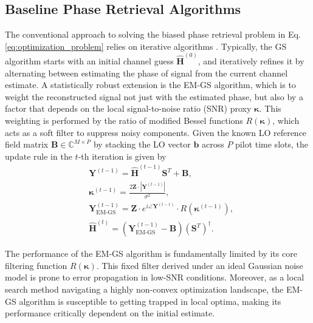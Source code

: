 \documentclass[journal]{IEEEtran}
\begin{document}
\subsection{Baseline Phase Retrieval Algorithms}
The conventional approach to solving the biased phase retrieval problem in Eq. \eqref{eq:optimization_problem} relies on iterative algorithms \cite{b2}. 
Typically, the GS algorithm starts with an initial channel guess $\hat{\mathbf{H}}^{(0)}$, and iteratively refines it by alternating between estimating the phase of signal from the current channel estimate. A statistically robust extension is the EM-GS algorithm, which is to weight the reconstructed signal not just with the estimated phase, but also by a factor that depends on the local signal-to-noise ratio (SNR) proxy $\boldsymbol{\kappa}$. This weighting is performed by the ratio of modified Bessel functions $R(\boldsymbol{\kappa})$, which acts as a soft filter to suppress noisy components. Given the known LO reference field matrix $\mathbf{B} \in \mathbb{C}^{M \times P}$ by stacking the LO vector $\mathbf{b}$ across $P$ pilot time slots, the update rule in the $t$-th iteration is given by \cite{b2}
\begin{align}
&\mathbf{Y}^{(t-1)} = \hat{\mathbf{H}}^{(t-1)} \mathbf{S}^T + {\mathbf{B}}, \label{eq:emgs_y_complex_revised} \\
&\mathbf{\boldsymbol{\kappa}}^{(t-1)} = \frac{2 \mathbf{Z} {\cdot} |\mathbf{Y}^{(t-1)}|}{\sigma^2}, \label{eq:emgs_kappa} \\
&\mathbf{Y}_{\text{EM-GS}}^{(t-1)} = \mathbf{Z} {\cdot} e^{i\angle\mathbf{Y}^{(t-1)}} {\cdot} R(\mathbf{\boldsymbol{\kappa}}^{(t-1)}) \label{eq:emgs_y_rec_revised}, \\
&\hat{\mathbf{H}}^{(t)} = (\mathbf{Y}_{\text{EM-GS}}^{(t-1)} - \mathbf{B}) (\mathbf{S}^T)^{\dagger} \label{eq:emgs_update_revised}.
\end{align}

The performance of the EM-GS algorithm is fundamentally limited by its core filtering function $R(\boldsymbol{\kappa})$. This fixed filter derived under an ideal Gaussian noise model is prone to error propagation in low-SNR conditions. Moreover, as a local search method navigating a highly non-convex optimization landscape, the EM-GS algorithm is susceptible to getting trapped in local optima, making its performance critically dependent on the initial estimate. 
\end{document}
